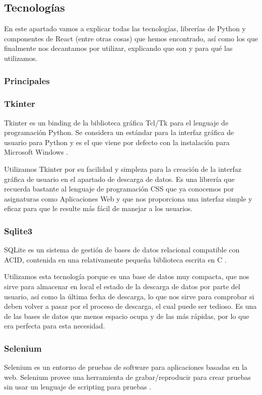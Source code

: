  	\subsection{Tecnologías}
 	
 	En este apartado vamos a explicar todas las tecnologías, librerías de Python y componentes de React (entre otras cosas) que hemos encontrado, así como los que finalmente nos decantamos por utilizar, explicando que son y para qué las utilizamos.
 	
 	\subsubsection{Principales}	
 		\subsubsection*{Tkinter}
 			Tkinter es un binding de la biblioteca gráfica Tcl/Tk para el lenguaje de programación Python. Se considera un estándar para la interfaz gráfica de usuario para Python y es el que viene por defecto con la instalación para Microsoft Windows \citep{tkinter}. 
  
 			Utilizamos Tkinter por su facilidad y simpleza para la creación de la interfaz gráfica de usuario en el apartado de descarga de datos. Es una librería que recuerda bastante al lenguaje de programación CSS que ya conocemos por asignaturas como Aplicaciones Web y que nos proporciona una interfaz simple y eficaz para que le resulte más fácil de manejar a los usuarios.
 		
 		\subsubsection*{Sqlite3}
 			SQLite es un sistema de gestión de bases de datos relacional compatible con ACID, contenida en una relativamente pequeña biblioteca escrita en C \citep{sqlite3}.   
 		
 	    	Utilizamos esta tecnología porque es una base de datos muy compacta, que nos sirve para almacenar en local el estado de la descarga de datos por parte del usuario, así como la última fecha de descarga, lo que nos sirve para comprobar si deben volver a pasar por el proceso de descarga, el cual puede ser tedioso. Es una de las bases de datos que menos espacio ocupa y de las más rápidas, por lo que era perfecta para esta necesidad.
 		
 		\subsubsection*{Selenium}
 			Selenium es un entorno de pruebas de software para aplicaciones basadas en la web. Selenium provee una herramienta de grabar/reproducir para crear pruebas sin usar un lenguaje de scripting para pruebas \citep{selenium}.   
 		
